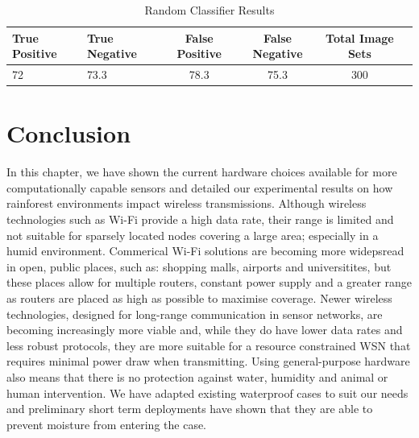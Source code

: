 		\begin{table}
			\hfill{}
			\begin{tabular}{|l|l|c|c|c|c|}
				\hline
					True Positive & True Negative & False Positive  & False Negative & Total Image Sets \\
				\hline
					72 & 73.3 & 78.3 & 75.3 & 300 \\
				\hline
			\end{tabular}
			\hfill{}
			\caption{Random Classifier Results}
			\label{table:random}
		\end{table}			
%	

\section{Conclusion}\label{tech:conc}
	In this chapter, we have shown the current hardware choices available for more computationally capable sensors and detailed our experimental results on how rainforest environments impact wireless transmissions. Although wireless technologies such as Wi-Fi provide a high data rate, their range is limited and not suitable for sparsely located nodes covering a large area; especially in a humid environment. Commerical Wi-Fi solutions are becoming more widepsread in open, public places, such as: shopping malls, airports and universitites, but these places allow for multiple routers, constant power supply and a greater range as routers are placed as high as possible to maximise coverage.
	Newer wireless technologies, designed for long-range communication in sensor networks, are becoming increasingly more viable and, while they do have lower data rates and less robust protocols, they are more suitable for a resource constrained WSN that requires minimal power draw when transmitting. 
	Using general-purpose hardware also means that there is no protection against water, humidity and animal or human intervention. We have adapted existing waterproof cases to suit our needs and preliminary short term deployments have shown that they are able to prevent moisture from entering the case.
	 